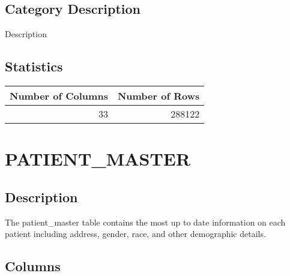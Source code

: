 \documentclass[
  letterpaper,
  DIV=11,
  numbers=noendperiod]{scrreprt}
\begin{document}
\hypertarget{category-description-26}{%
\section*{Category Description}\label{category-description-26}}

Description

\hypertarget{statistics-26}{%
\section*{Statistics}\label{statistics-26}}

\begin{longtable}{rr}
\toprule
Number of Columns & Number of Rows \\ 
\midrule
33 & 288122 \\ 
\bottomrule
\end{longtable}

\hypertarget{patient_master}{%
\chapter*{PATIENT\_MASTER}\label{patient_master}}

\hypertarget{description-27}{%
\section*{Description}\label{description-27}}

The patient\_master table contains the most up to date information on
each patient including address, gender, race, and other demographic
details.

\hypertarget{columns-27}{%
\section*{Columns}\label{columns-27}}
\end{document}
